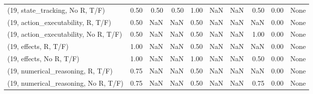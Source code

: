\begin{table*}[h!]
\begin{adjustbox}{width=2\columnwidth,center}
\begin{tabular}{lrrr|rrr|rrr}
(19, state\_tracking, No R, T/F)       &                      0.50 &                  0.50 &                      0.50 &                          1.00 &                       NaN &                           NaN &                                   0.50 &                               0.00 &                                  None \\
(19, action\_executability, R, T/F)    &                      0.50 &                   NaN &                       NaN &                          0.50 &                       NaN &                           NaN &                                    NaN &                               0.00 &                                  None \\
(19, action\_executability, No R, T/F) &                      0.50 &                   NaN &                       NaN &                          0.50 &                       NaN &                           NaN &                                   1.00 &                               0.00 &                                  None \\
(19, effects, R, T/F)                 &                      1.00 &                   NaN &                       NaN &                          0.50 &                       NaN &                           NaN &                                    NaN &                               0.00 &                                  None \\
(19, effects, No R, T/F)              &                      1.00 &                   NaN &                       NaN &                          1.00 &                       NaN &                           NaN &                                   0.50 &                               0.00 &                                  None \\
(19, numerical\_reasoning, R, T/F)     &                      0.75 &                   NaN &                       NaN &                          0.50 &                       NaN &                           NaN &                                    NaN &                               0.00 &                                  None \\
(19, numerical\_reasoning, No R, T/F)  &                      0.75 &                   NaN &                       NaN &                          0.50 &                       NaN &                           NaN &                                   0.75 &                               0.00 &                                  None \\

\end{tabular}
\end{adjustbox}
\end{table*}
